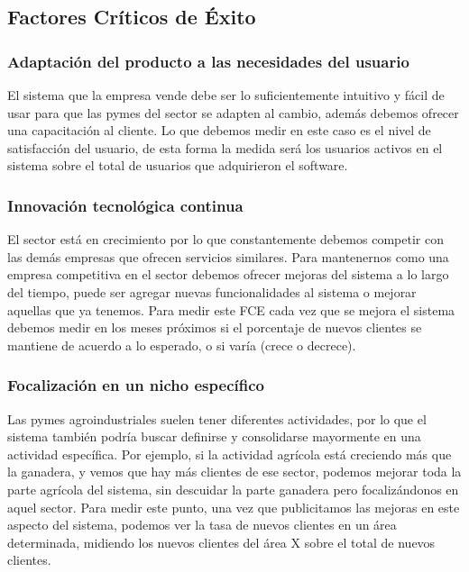 \documentclass[man,12pt]{apa7}
\begin{document}
\subsection{Factores Críticos de Éxito}

\subsubsection{Adaptación del producto a las necesidades del usuario}

El sistema que la empresa vende debe ser lo suficientemente intuitivo y fácil de usar para que las pymes del sector se adapten al cambio, además debemos ofrecer una capacitación al cliente. Lo que debemos medir en este caso es el nivel de satisfacción del usuario, de esta forma la medida será los usuarios activos en el sistema sobre el total de usuarios que adquirieron el software.

\subsubsection{Innovación tecnológica continua}

El sector está en crecimiento por lo que constantemente debemos competir con las demás empresas que ofrecen servicios similares. Para mantenernos como una empresa competitiva en el sector debemos ofrecer mejoras del sistema a lo largo del tiempo, puede ser agregar nuevas funcionalidades al sistema o mejorar aquellas que ya tenemos. Para medir este FCE cada vez que se mejora el sistema debemos medir en los meses próximos si el porcentaje de nuevos clientes se mantiene de acuerdo a lo esperado, o si varía (crece o decrece).

\subsubsection{Focalización en un nicho específico}

Las pymes agroindustriales suelen tener diferentes actividades, por lo que el sistema también podría buscar definirse y consolidarse mayormente en una actividad específica. Por ejemplo, si la actividad agrícola está creciendo más que la ganadera, y vemos que hay más clientes de ese sector, podemos mejorar toda la parte agrícola del sistema, sin descuidar la parte ganadera pero focalizándonos en aquel sector. Para medir este punto, una vez que publicitamos las mejoras en este aspecto del sistema, podemos ver la tasa de nuevos clientes en un área determinada, midiendo los nuevos clientes del área X sobre el total de nuevos clientes.
\end{document}
